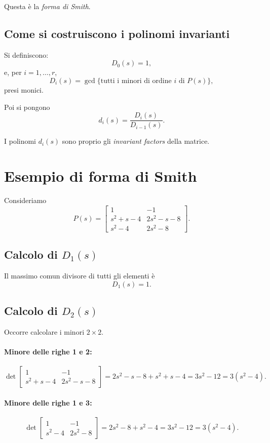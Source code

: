 Questa è la \emph{forma di Smith}.

\subsection{Come si costruiscono i polinomi invarianti}

Si definiscono:
\[
D_0(s)=1,
\]
e, per \(i=1,\dots,r\),
\[
D_i(s)=\gcd\{\text{tutti i minori di ordine } i \text{ di } P(s)\},
\]
presi monici.

Poi si pongono
\[
d_i(s)=\frac{D_i(s)}{D_{i-1}(s)}.
\]

I polinomi \(d_i(s)\) sono proprio gli \emph{invariant factors} della matrice.

\bigskip

\section{Esempio di forma di Smith}

Consideriamo
\[
P(s)=
\begin{bmatrix}
1 & -1\\
s^2+s-4 & 2s^2-s-8\\
s^2-4 & 2s^2-8
\end{bmatrix}.
\]

\subsection{Calcolo di \(D_1(s)\)}

Il massimo comun divisore di tutti gli elementi è
\[
D_1(s)=1.
\]

\subsection{Calcolo di \(D_2(s)\)}

Occorre calcolare i minori \(2\times 2\).

\paragraph{Minore delle righe 1 e 2:}
\[
\det
\begin{bmatrix}
1 & -1\\
s^2+s-4 & 2s^2-s-8
\end{bmatrix}
=
2s^2-s-8+s^2+s-4
=
3s^2-12
=
3(s^2-4).
\]

\paragraph{Minore delle righe 1 e 3:}
\[
\det
\begin{bmatrix}
1 & -1\\
s^2-4 & 2s^2-8
\end{bmatrix}
=
2s^2-8+s^2-4
=
3s^2-12
=
3(s^2-4).
\]

